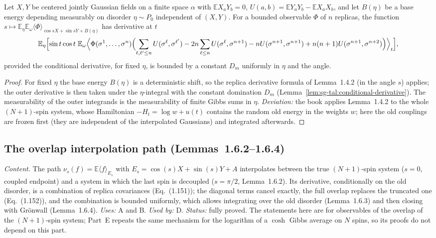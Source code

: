 \begin{lemma}
\label{lem:sg-tal:conditional-replica-derivative}
  \leanok
{}
Let $X,Y$ be centered jointly Gaussian fields on a finite space $\alpha$ with
$\mathbb E X_aY_b=0$, $U(a,b)=\mathbb E Y_aY_b-\mathbb E X_aX_b$, and let $B(\eta)$ be a base energy
depending measurably on disorder $\eta\sim P_0$ independent of $(X,Y)$.  For a bounded observable $\Phi$ of
$n$ replicas, the function
$s\mapsto\mathbb E_\eta\mathbb E_\omega\langle\Phi\rangle_{\cos s X+\sin s Y+B(\eta)}$ has derivative at $t$
\[
 \mathbb E_\eta\Bigl[\sin t\cos t\;\mathbb E_\omega\Bigl\langle\Phi(\sigma^1,\dots,\sigma^n)
 \Bigl(\sum_{\ell,\ell'\le n}U(\sigma^\ell,\sigma^{\ell'})-2n\sum_{\ell\le n}U(\sigma^\ell,\sigma^{n+1})
 -nU(\sigma^{n+1},\sigma^{n+1})+n(n+1)U(\sigma^{n+1},\sigma^{n+2})\Bigr)\Bigr\rangle_t\Bigr],
\]
provided the conditional derivative, for fixed $\eta$, is bounded by a constant $D_m$ uniformly in
$\eta$ and the angle.
\end{lemma}
\begin{proof}
  \leanok
For fixed $\eta$ the base energy $B(\eta)$ is a deterministic shift, so the replica derivative
formula of Lemma~1.4.2 (in the angle $s$) applies; the outer derivative is then taken under the
$\eta$-integral with the constant domination $D_m$
(Lemma~\ref{lem:sg-tal:conditional-derivative}).  The measurability of the outer integrands is
the measurability of finite Gibbs sums in $\eta$.
\emph{Deviation:} the book applies Lemma~1.4.2 to the whole $(N+1)$-spin system, whose Hamiltonian
$-H_t=\log w+u(t)$ contains the random old energy in the weights $w$; here the old couplings are
frozen first (they are independent of the interpolated Gaussians) and integrated afterwards.
\end{proof}

\subsection{The overlap interpolation path (Lemmas~1.6.2--1.6.4)}
\label{sec:sg-tal:cavity-path}

\emph{Content.} The path $\nu_s(f)=\mathbb E\langle f\rangle_{E_s}$ with
$E_s=\cos(s)X+\sin(s)Y+A$ interpolates between the true $(N+1)$-spin system ($s=0$, coupled
endpoint) and a system in which the last spin is decoupled ($s=\pi/2$, Lemma~1.6.2).
Its derivative, conditionally on the old disorder, is a combination of replica covariances
(Eq.~(1.151)); the diagonal terms cancel exactly, the full overlap replaces the truncated one
(Eq.~(1.152)), and the combination is bounded uniformly, which allows integrating over the old
disorder (Lemma~1.6.3) and then closing with Gr\"onwall (Lemma~1.6.4).
\emph{Uses:} A and B.  \emph{Used by:} D.  \emph{Status:} fully proved.  The statements here are for
observables of the overlap of the $(N+1)$-spin system; Part~E repeats the same mechanism for the logarithm
of a $\cosh$ Gibbs average on $N$ spins, so its proofs do not depend on this part.

